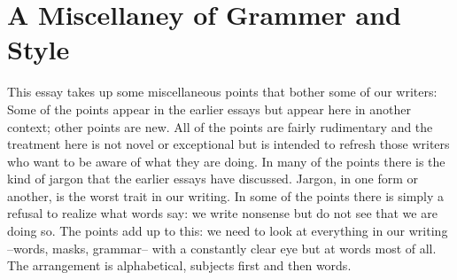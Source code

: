 \documentclass[
    oneside,
    11pt,
    draft
]{memoir}
\begin{document}
\chapter{A Miscellaney of Grammer and Style}

This essay takes up some miscellaneous points that bother some of our writers: Some of the points appear in the earlier essays but appear here in another context; other points are new. All of the points are fairly rudimentary and the treatment here is not novel or exceptional but is intended to refresh those writers who want to be aware of what they are doing. In many of the points there is the kind of jargon that the earlier essays have discussed. Jargon, in one form or another, is the worst trait in our writing. In some of the points there is simply a refusal to realize what words say: we write nonsense but do not see that we are doing so. The points add up to this: we need to look at everything in our writing --words, masks, grammar-- with a constantly clear eye but at words most of all. The arrangement is alphabetical, subjects first and then words. 
\end{document}
